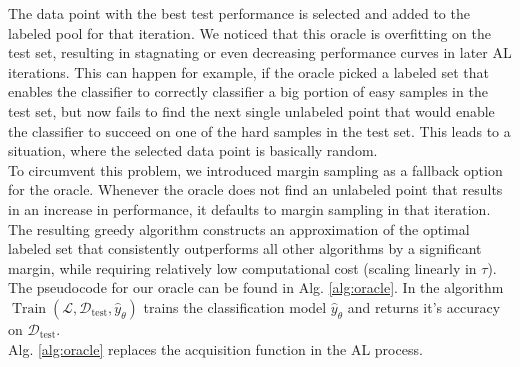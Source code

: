 \documentclass[]{article}
\newcommand{\D}{\mathcal{D}}
\newcommand{\LL}{\mathcal{L}}
\begin{document}
The data point with the best test performance is selected and added to the labeled pool for that iteration.
We noticed that this oracle is overfitting on the test set, resulting in stagnating or even decreasing performance curves in later AL iterations.
This can happen for example, if the oracle picked a labeled set that enables the classifier to correctly classifier a big portion of easy samples in the test set, but now fails to find the next single unlabeled point that would enable the classifier to succeed on one of the hard samples in the test set.
This leads to a situation, where the selected data point is basically random.\\
To circumvent this problem, we introduced margin sampling \cite{wang2014new} as a fallback option for the oracle.
Whenever the oracle does not find an unlabeled point that results in an increase in performance, it defaults to margin sampling in that iteration.
The resulting greedy algorithm constructs an approximation of the optimal labeled set that consistently outperforms all other algorithms by a significant margin, while requiring relatively low computational cost (scaling linearly in $\tau$).
The pseudocode for our oracle can be found in Alg. \ref{alg:oracle}.
In the algorithm $\operatorname{Train}(\LL, \D_\text{test}, \hat y_\theta)$ trains the classification model $\hat y_\theta$ and returns it's accuracy  on $\D_\text{test}$. \\
Alg. \ref{alg:oracle} replaces the acquisition function in the AL process.


\end{document}
